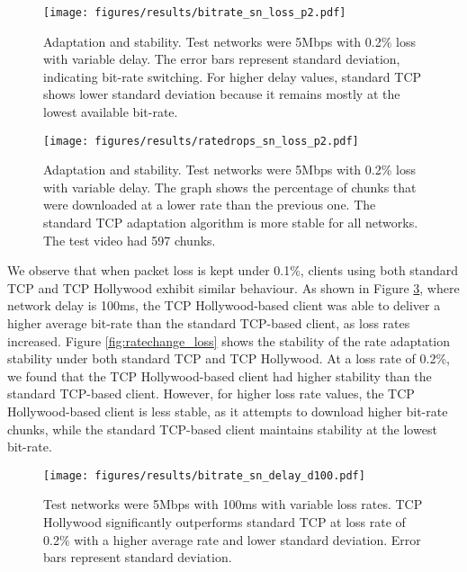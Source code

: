 \begin{figure}
  \centering
  \texttt{[image: figures/results/bitrate\_sn\_loss\_p2.pdf]}
  \caption{Adaptation and stability. Test networks were 5Mbps with 0.2\% loss with variable 
           delay. The error bars represent standard deviation, indicating bit-rate switching. For higher delay values, 
           standard TCP shows lower standard deviation because it remains mostly at the 
           lowest available bit-rate. }
  \label{fig:rate_delay2}
\end{figure}

\begin{figure}
  \centering
  \texttt{[image: figures/results/ratedrops\_sn\_loss\_p2.pdf]}
  \caption{Adaptation and stability. Test networks were 5Mbps with 0.2\% loss with variable 
           delay. The graph shows the percentage of chunks that were downloaded at a lower 
           rate than the previous one. The standard TCP adaptation algorithm is more stable 
           for all networks. The test video had 597 chunks.}
  \label{fig:ratechange_delay2}
\end{figure}

We observe that when packet loss is kept under 0.1\%, clients using both standard TCP and TCP 
Hollywood exhibit similar behaviour. As shown in Figure \ref{fig:rate_loss}, where network delay is 100ms, 
the TCP Hollywood-based client was able to deliver a higher average bit-rate than the standard TCP-based client, as
loss rates increased. Figure \ref{fig:ratechange_loss} shows the stability of the rate adaptation
stability under both standard TCP and TCP Hollywood. At a loss rate of 0.2\%, we found that the
TCP Hollywood-based client had higher stability than the standard TCP-based client. However,
for higher loss rate values, the TCP Hollywood-based client is less stable, as it attempts
to download higher bit-rate chunks, while the standard TCP-based client maintains stability
at the lowest bit-rate.

\begin{figure}
  \centering
  \texttt{[image: figures/results/bitrate\_sn\_delay\_d100.pdf]}
  \caption{Test networks were 5Mbps with 100ms with variable loss rates. TCP Hollywood 
           significantly outperforms standard TCP at loss rate of 0.2\% with a higher 
           average rate and lower standard deviation. Error bars represent standard deviation.}
  \label{fig:rate_loss}
\end{figure}

